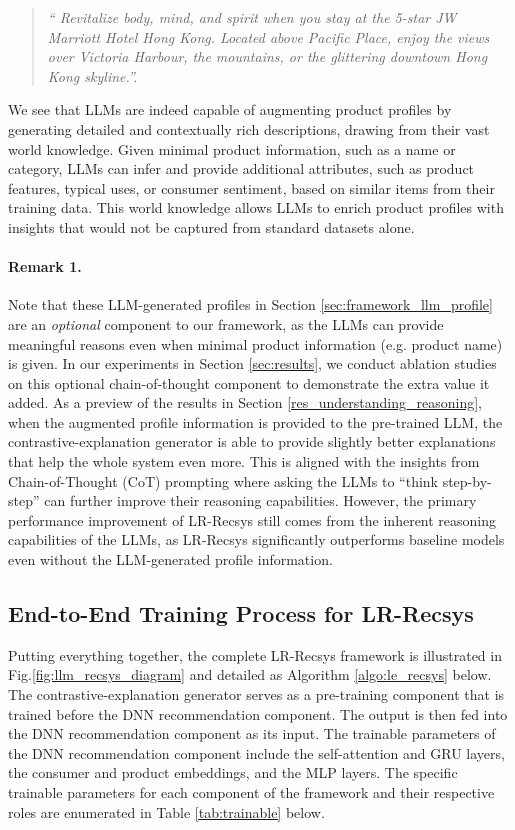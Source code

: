 \begin{quote}
\emph{`` Revitalize body, mind, and spirit when you stay at the 5-star JW Marriott Hotel Hong Kong. Located above Pacific Place, enjoy the views over Victoria Harbour, the mountains, or the glittering downtown Hong Kong skyline.''.}
\end{quote} 

We see that LLMs are indeed capable of augmenting product profiles by generating detailed and contextually rich descriptions, drawing from their vast world knowledge. Given minimal product information, such as a name or category, LLMs can infer and provide additional attributes, such as product features, typical uses, or consumer sentiment, based on similar items from their training data. This world knowledge allows LLMs to enrich product profiles with insights that would not be captured from standard datasets alone.

\noindent \paragraph{\textbf{Remark 1.}} Note that these LLM-generated profiles in Section \ref{sec:framework_llm_profile} are an \emph{optional} component to our framework, as the LLMs can provide meaningful reasons even when minimal product information (e.g. product name) is given. In our experiments in Section \ref{sec:results}, we conduct ablation studies on this optional chain-of-thought component to demonstrate the extra value it added. As a preview of the results in Section \ref{res_understanding_reasoning}, when the augmented profile information is provided to the pre-trained LLM, the contrastive-explanation generator is able to provide slightly better explanations that help the whole system even more. This is aligned with the insights from Chain-of-Thought (CoT) prompting \citep{wei2022chain} where asking the LLMs to ``think step-by-step'' can further improve their reasoning capabilities. However, the primary performance improvement of LR-Recsys still comes from the inherent reasoning capabilities of the LLMs, as LR-Recsys significantly outperforms baseline models even without the LLM-generated profile information.


\subsection{End-to-End Training Process for LR-Recsys}
\label{sec:framework_training}  

Putting everything together, the complete LR-Recsys framework is illustrated in Fig.\ref{fig:llm_recsys_diagram} and detailed as Algorithm \ref{algo:le_recsys} below. The contrastive-explanation generator serves as a pre-training component that is trained before the DNN recommendation component. The output is then fed into the DNN recommendation component as its input. The trainable parameters of the DNN recommendation component include the self-attention and GRU layers, the consumer and product embeddings, and the MLP layers. The specific trainable parameters for each component of the framework and their respective roles are enumerated in Table \ref{tab:trainable} below.

